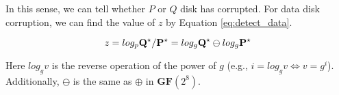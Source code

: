 In this sense, we can tell whether $P$ or $Q$ disk has corrupted. For data disk corruption, we can find the value of $z$ by Equation \ref{eq:detect_data}.

\begin{equation}\label{eq:detect_data}
	z = log_p{{\bf Q}^\star/{\bf P}^\star} = log_{g}{\bf Q}^\star\ominus log_{g}{\bf P}^\star
\end{equation}

Here $log_{g}v$ is the reverse operation of the power of $g$ (e.g., $i=log_{g}v\!\iff\!v=g^i$). Additionally, $\ominus$ is the same as $\oplus$ in $\mathbf{GF}(2^8)$.





